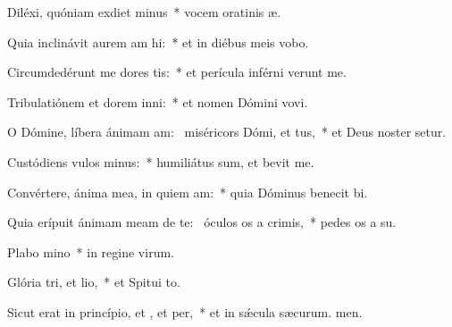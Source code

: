 \item Diléxi, quóniam exdiet minus~* vocem oratinis æ.
\item Quia inclinávit aurem am hi:~* et in diébus meis vobo.
\item Circumdedérunt me dores tis:~* et perícula inférni verunt me.
\item Tribulatiónem et dorem inni:~* et nomen Dómini vovi.
\item O Dómine, líbera ánimam am:~\pscross{} miséricors Dómi, et tus,~* et Deus noster setur.
\item Custódiens vulos minus:~* humiliátus sum, et bevit me.
\item Convértere, ánima mea, in quiem am:~* quia Dóminus benecit bi.
\item Quia erípuit ánimam meam de te:~\pscross{} óculos os a crimis,~* pedes os a su.
\item Plabo mino~* in regine virum.
\item Glória tri, et lio,~* et Spitui to.
\item Sicut erat in princípio, et , et per,~* et in sǽcula sæcurum. men.
